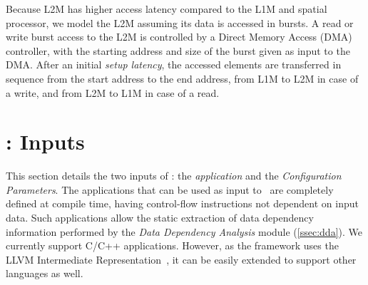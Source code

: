 

\label{ssec:layer2_model}
Because L2M has higher access latency compared to the L1M and spatial processor, we model the L2M assuming its data is accessed in bursts.
A read or write burst access to the L2M is controlled by a Direct Memory Access (DMA) controller, with the starting address and size of the burst given as input to the DMA. After an initial \textit{setup latency}, the accessed elements are transferred in sequence from the start address to the end address, from L1M to L2M in case of a write, and from L2M to L1M in case of a read.

\vspace{-1mm}
\section{\frameworkname: Inputs}
This section details the two inputs of \frameworkname: the \textit{application} and the \textit{Configuration Parameters}.
\label{ssec:app}
The applications that can be used as input to \frameworkname~are completely defined at compile time, having control-flow instructions not dependent on input data. Such applications allow the static extraction of data dependency information performed by the \textit{Data Dependency Analysis} module (\ref{ssec:dda}). We currently support C/C++ applications. However, as the framework uses the LLVM Intermediate Representation~\cite{llvm}, it can be easily extended to support other languages as well.

